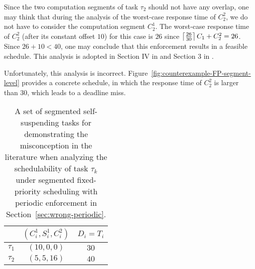 Since the two computation segments of task $\tau_2$ should not have any overlap, one may think that during the analysis of the worst-case response time of $C_2^2$, we do not have to consider the computation segment $C_2^1$. The worst-case response time of $C_2^2$ (after its constant offset $10$) for this case is $26$ since $\left\lceil{\frac{26}{30}}\right\rceil C_1 + C_2^2 = 26$. 
Since $26+10 < 40$, one may conclude that this enforcement results in a feasible schedule. This analysis is adopted in Section IV in \cite{RTSS-KimANR13} and Section 3 in \cite{DBLP:journals/ieicet/DingTT09}. 

Unfortunately, this analysis is incorrect.
Figure~\ref{fig:counterexample-FP-segment-level} provides a concrete schedule, in which the response time of $C_2^2$ is larger than $30$, which leads to a deadline miss.

\begin{table} [t]
\centering
    \begin{tabular}{|c|c|c|}
 \hline
        & $(C_i^1, S_i^1, C_i^2)$ &  $D_i=T_i$\\ 
        \hline
        $\tau_1$ & $(10, 0, 0)$ &  $30$\\ 
        $\tau_2$ &  $(5, 5, 16)$ & $40$  \\ 
        \hline
    \end{tabular} 
    \caption{A set of segmented self-suspending tasks for demonstrating the misconception in the literature when analyzing the schedulability of task $\tau_k$ under 
segmented fixed-priority scheduling with periodic enforcement in Section~\ref{sec:wrong-periodic}.}
    \label{table:ex-periodic}
\end{table}


